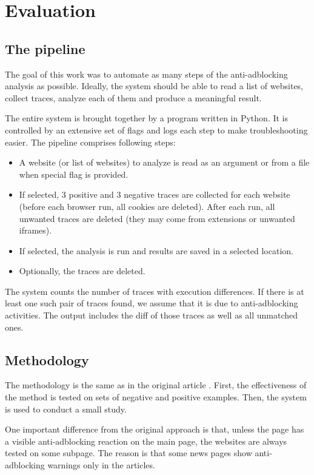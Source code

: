 \chapter{Evaluation}
\label{evaluation}

\section{The pipeline}

The goal of this work was to automate as many steps of the anti-adblocking analysis as possible.
Ideally, the system should be able to read a list of websites, collect traces, analyze
each of them and produce a meaningful result.

The entire system is brought together by a program written in Python.
It is controlled by an extensive set of flags and logs each step to make troubleshooting easier.
The pipeline comprises following steps:
\begin{itemize}
  \item A website (or list of websites) to analyze is read as an argument or from a file when special flag is provided.
  \item If selected, 3 positive and 3 negative traces are collected for each website (before each browser run,
           all cookies are deleted). After each run, all unwanted traces are deleted (they may come from extensions 
           or unwanted iframes).
  \item If selected, the analysis is run and results are saved in a selected location.
  \item Optionally, the traces are deleted.
\end{itemize}

The system counts the number of traces with execution differences.
If there is at least one such pair of traces found, we assume that it is due to anti-adblocking activities.
The output includes the diff of those traces as well as all unmatched ones.

\section{Methodology}
\label{methodology}

The methodology is the same as in the original article \cite{DBLP:conf/ndss/ZhuHQSY18}.
First, the effectiveness of the method is tested on sets of negative and positive examples.
Then, the system is used to conduct a small study.

One important difference from the original approach is that, unless the page has a visible anti-adblocking
reaction on the main page, the websites are always tested on some subpage. The reason is that
some news pages show anti-adblocking warnings only in the articles.


